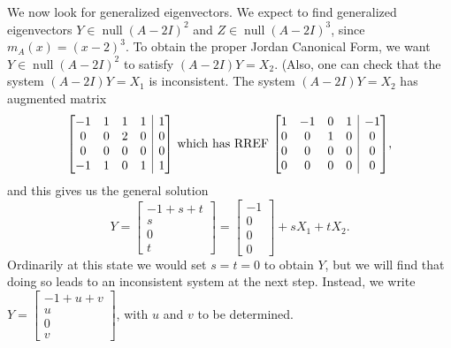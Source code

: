 \documentclass[letterpaper,12pt]{article}
\makeatletter
\DeclareMathOperator{\nul}{null}
\newenvironment{amatrix}[1]{%
  \left[\begin{array}{@{}*{#1}{c}|c@{}}
}{%
  \end{array}\right]
}
\makeatother
\begin{document}
We now look for generalized eigenvectors. We expect to find generalized eigenvectors $Y\in\nul(A-2I)^2$ and $Z\in\nul (A-2I)^3$, since $m_A(x)=(x-2)^3$. To obtain the proper Jordan Canonical Form, we want $Y\in\nul(A-2I)^2$ to satisfy $(A-2I)Y=X_2$. (Also, one can check that the system $(A-2I)Y=X_1$ is inconsistent. The system $(A-2I)Y=X_2$ has augmented matrix
\[
 \begin{amatrix}{4}
  -1&1&1&1&1\\0&0&2&0&0\\0&0&0&0&0\\-1&1&0&1&1
 \end{amatrix} \text{ which has RREF }
\begin{amatrix}{4}
 1&-1&0&1&-1\\0&0&1&0&0\\0&0&0&0&0\\0&0&0&0&0
\end{amatrix},
\]
and this gives us the general solution
\[
 Y = \begin{bmatrix}-1+s+t\\s\\0\\t\end{bmatrix} = \begin{bmatrix}-1\\0\\0\\0\end{bmatrix}+sX_1+tX_2.
\]
Ordinarily at this state we would set $s=t=0$ to obtain $Y$, but we will find that doing so leads to an inconsistent system at the next step. Instead, we write $Y=\begin{bmatrix}-1+u+v\\u\\0\\v\end{bmatrix}$, with $u$ and $v$ to be determined.
\end{document}
